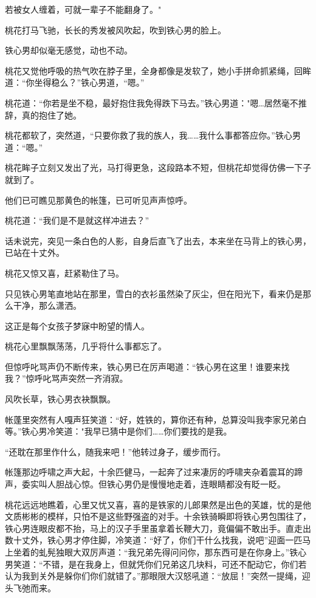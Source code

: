 \documentclass[12pt,oneside]{book}
\begin{document}
若被女人缠着，可就一辈子不能翻身了。"

桃花打马飞驰，长长的秀发被风吹起，吹到铁心男的脸上。

铁心男却似毫无感觉，动也不动。

桃花又觉他呼吸的热气吹在脖子里，全身都像是发软了，她小手拼命抓紧绳，回眸道：``你坐得稳么？''铁心男道，``嗯。''

桃花道：``你若是坐不稳，最好抱住我免得跌下马去。''铁心男道："嗯\ldots 居然毫不推辞，真的抱住了她。

桃花都软了，突然道，``只要你救了我的族人，我\ldots\ldots 我什么事都答应你。''铁心男道：``嗯。''

桃花眸子立刻又发出了光，马打得更急，这段路本不短，但桃花却觉得仿佛一下子就到了。

他们已可瞧见那黄色的帐篷，已可听见声声惊呼。

桃花道：``我们是不是就这样冲进去？''

话未说完，突见一条白色的人影，自身后直飞了出去，本来坐在马背上的铁心男，已站在十丈外。

桃花又惊又喜，赶紧勒住了马。

只见铁心男笔直地站在那里，雪白的衣衫虽然染了灰尘，但在阳光下，看来仍是那么干净，那么潇洒。

这正是每个女孩子梦寐中盼望的情人。

桃花心里飘飘荡荡，几乎将什么事都忘了。

但惊呼叱骂声仍不断传来，铁心男已在厉声喝道：``铁心男在这里！谁要来找我？''惊呼叱骂声突然一齐消寂。

风吹长草，铁心男衣袂飘飘。

帐蓬里突然有人嘎声狂笑道：``好，姓铁的，算你还有种，总算没叫我李家兄弟白等。''铁心男冷笑道："我早已猜中是你们\ldots\ldots 你们要找的是我。

``还耽在那里作什么，随我来吧！''他转过身子，缓步而行。

帐篷那边呼啸之声大起，十余匹健马，一起奔了过来凄厉的呼啸夹杂着震耳的蹄声，委实叫人胆战心惊。但铁心男仍是慢慢地走着，连眼睛都没有眨一眨。

桃花远远地瞧着，心里又忧又喜，喜的是铁家的儿郎果然是出色的芙雄，忧的是他文质彬彬的模样，只怕不是这些野强盗的对手。十余铁骑瞬即将铁心男包围往了，铁心男连眼皮都不抬，马上的汉子手里虽拿着长鞭大刀，竟偏偏不敢出手。直走出数十丈外，铁心男才停住脚，冷笑道：``好了，你们干什么找我，说吧''迎面一匹马上坐着的虬髡独眼大双厉声道：``我兄弟先得问问你，那东西可是在你身上。''铁心男笑道：``不错，是在我身上，但就凭你们兄弟这几块料，可还不配动它，你们若认为我到关外是躲你们你们就错了。''那眼限大汉怒吼道：``放屈！''突然一提绳，迎头飞弛而来。
\end{document}
